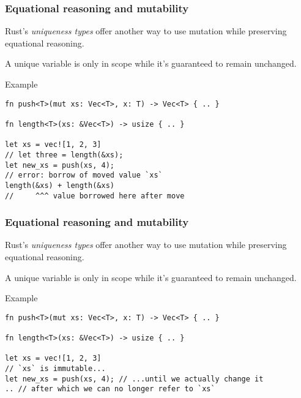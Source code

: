 \documentclass[t]{beamer}
\begin{document}
\begin{frame}[fragile]
\frametitle{Equational reasoning and mutability}
Rust's \emph{uniqueness types} offer another way to use mutation while
preserving equational reasoning.

\medskip

A unique variable is only in scope while it's guaranteed to remain unchanged.

\begin{block}{Example}
\begin{verbatim}
fn push<T>(mut xs: Vec<T>, x: T) -> Vec<T> { .. }

fn length<T>(xs: &Vec<T>) -> usize { .. }

let xs = vec![1, 2, 3]
// let three = length(&xs);
let new_xs = push(xs, 4);
// error: borrow of moved value `xs`
length(&xs) + length(&xs)
//     ^^^ value borrowed here after move
\end{verbatim}
\end{block}

\end{frame}


\begin{frame}[fragile]
\frametitle{Equational reasoning and mutability}
Rust's \emph{uniqueness types} offer another way to use mutation while
preserving equational reasoning.

\medskip

A unique variable is only in scope while it's guaranteed to remain unchanged.

\begin{block}{Example}
\begin{verbatim}
fn push<T>(mut xs: Vec<T>, x: T) -> Vec<T> { .. }

fn length<T>(xs: &Vec<T>) -> usize { .. }

let xs = vec![1, 2, 3]
// `xs` is immutable...
let new_xs = push(xs, 4); // ...until we actually change it
.. // after which we can no longer refer to `xs`
\end{verbatim}
\end{block}

\end{frame}


\begin{frame}[c,fragile]
\begin{center}
\end{center}
\end{frame}
\end{document}
